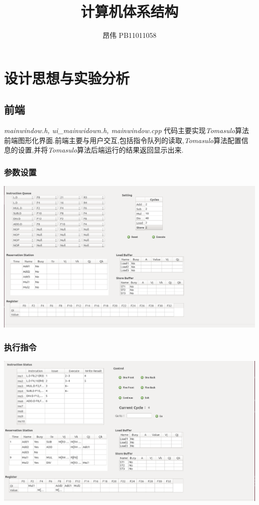 \documentclass{paper}
\title{ 计算机体系结构\\ 
	\center{实验二\  实现Tomasulo算法模拟器}}
\author{昂伟 PB11011058}
\begin{document}
\maketitle

\section{设计思想与实验分析}
	\subsection*{前端} \textit{mainwindow.h, ui\_mainwidown.h, mainwindow.cpp} 代码主要实现\textit{Tomasulo}算法前端图形化界面.前端主要与用户交互,包括指令队列的读取,\textit{Tomasulo}算法配置信息的设置,并将\textit{Tomasulo}算法后端运行的结果返回显示出来.
	
	\subsubsection*{参数设置}
	\begin{center}
	\includegraphics[width=.8\textwidth]{./frontend1.png}
	\end{center}
	
	\subsubsection*{执行指令}
	\begin{center}
	\includegraphics[width=.8\textwidth]{./frontend2.png}
	\end{center}
	
\end{document}
